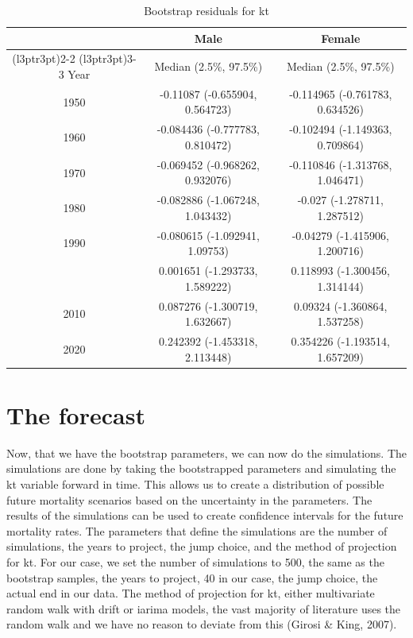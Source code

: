 \documentclass[
  12pt,
]{report}
\begin{document}
\begin{longtable}[t]{ccc}
\caption{\label{tab:unnamed-chunk-5}Bootstrap residuals for kt}\\
\toprule
\multicolumn{1}{c}{ } & \multicolumn{1}{c}{Male} & \multicolumn{1}{c}{Female} \\
\cmidrule(l{3pt}r{3pt}){2-2} \cmidrule(l{3pt}r{3pt}){3-3}
Year & Median (2.5\%, 97.5\%) & Median (2.5\%, 97.5\%)\\
\midrule
1950 & -0.11087 (-0.655904, 0.564723) & -0.114965 (-0.761783, 0.634526)\\
1960 & -0.084436 (-0.777783, 0.810472) & -0.102494 (-1.149363, 0.709864)\\
1970 & -0.069452 (-0.968262, 0.932076) & -0.110846 (-1.313768, 1.046471)\\
1980 & -0.082886 (-1.067248, 1.043432) & -0.027 (-1.278711, 1.287512)\\
1990 & -0.080615 (-1.092941, 1.09753) & -0.04279 (-1.415906, 1.200716)\\
\addlinespace
2000 & 0.001651 (-1.293733, 1.589222) & 0.118993 (-1.300456, 1.314144)\\
2010 & 0.087276 (-1.300719, 1.632667) & 0.09324 (-1.360864, 1.537258)\\
2020 & 0.242392 (-1.453318, 2.113448) & 0.354226 (-1.193514, 1.657209)\\
\bottomrule
\end{longtable}

\section{The forecast}\label{the-forecast}

Now, that we have the bootstrap parameters, we can now do the
simulations. The simulations are done by taking the bootstrapped
parameters and simulating the kt variable forward in time. This allows
us to create a distribution of possible future mortality scenarios based
on the uncertainty in the parameters. The results of the simulations can
be used to create confidence intervals for the future mortality rates.
The parameters that define the simulations are the number of
simulations, the years to project, the jump choice, and the method of
projection for kt. For our case, we set the number of simulations to
500, the same as the bootstrap samples, the years to project, 40 in our
case, the jump choice, the actual end in our data. The method of
projection for kt, either multivariate random walk with drift or iarima
models, the vast majority of literature uses the random walk and we have
no reason to deviate from this (Girosi \& King, 2007).
\end{document}
